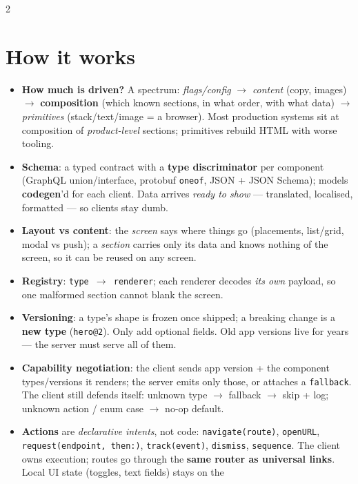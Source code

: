 \documentclass[8pt]{extarticle}
\newcommand\ct[1]{\texttt{#1}}
\begin{document}
\begin{multicols}{2}
\small\raggedright

\section{How it works}
\begin{itemize}
  \item \textbf{How much is driven?} A spectrum: \emph{flags/config} $\to$ \emph{content}
        (copy, images) $\to$ \textbf{composition} (which known sections, in what order,
        with what data) $\to$ \emph{primitives} (stack/text/image = a browser). Most
        production systems sit at composition of \emph{product-level} sections; primitives
        rebuild HTML with worse tooling.
  \item \textbf{Schema}: a typed contract with a \textbf{type discriminator} per component
        (GraphQL union/interface, protobuf \ct{oneof}, JSON + JSON Schema); models
        \textbf{codegen}'d for each client. Data arrives \emph{ready to show} — translated,
        localised, formatted — so clients stay dumb.
  \item \textbf{Layout vs content}: the \emph{screen} says where things go (placements,
        list/grid, modal vs push); a \emph{section} carries only its data and knows nothing
        of the screen, so it can be reused on any screen.
  \item \textbf{Registry}: \ct{type $\to$ renderer}; each renderer decodes \emph{its own}
        payload, so one malformed section cannot blank the screen.
  \item \textbf{Versioning}: a type's shape is frozen once shipped; a breaking change is a
        \textbf{new type} (\ct{hero@2}). Only add optional fields. Old app versions live for
        years — the server must serve all of them.
  \item \textbf{Capability negotiation}: the client sends app version + the component
        types/versions it renders; the server emits only those, or attaches a
        \ct{fallback}. The client still defends itself: unknown type $\to$ fallback
        $\to$ skip + log; unknown action / enum case $\to$ no-op default.
  \item \textbf{Actions} are \emph{declarative intents}, not code: \ct{navigate(route)},
        \ct{openURL}, \ct{request(endpoint, then:)}, \ct{track(event)}, \ct{dismiss},
        \ct{sequence}. The client owns execution; routes go through the \textbf{same
        router as universal links}. Local UI state (toggles, text fields) stays on the

\end{itemize}
\end{multicols}
\end{document}
